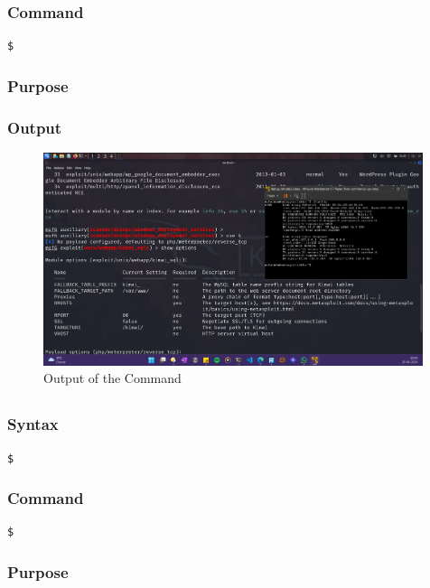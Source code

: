 \documentclass[11pt]{article}
\begin{document}
\subsubsection*{Command}
\begin{verbatim}
$
\end{verbatim}

\subsubsection*{Purpose}

\subsubsection*{Output}
\begin{figure}[H]
    \centering
    \includegraphics[width=0.99\textwidth]{a3_ss (24).png}
    \caption{Output of the Command}
\end{figure}
\subsection{}

\subsubsection*{Syntax}
\begin{verbatim}
$
\end{verbatim}

\subsubsection*{Command}
\begin{verbatim}
$
\end{verbatim}

\subsubsection*{Purpose}
\end{document}
